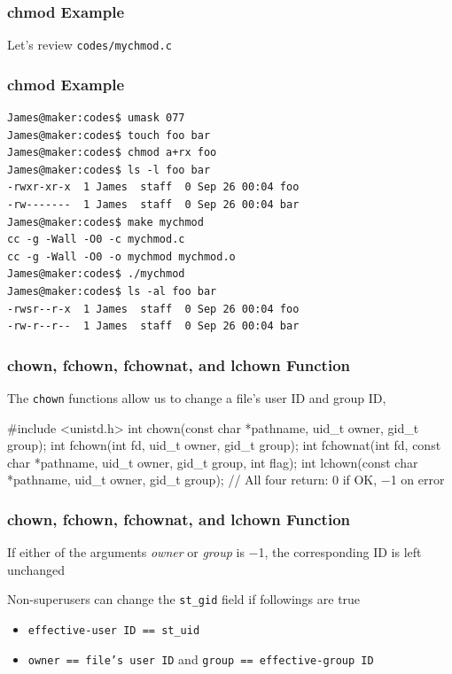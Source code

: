 \documentclass[newPxFont,sthlmFooter,nooffset]{beamer}
\begin{document}
\begin{frame}[containsverbatim,t]
  \frametitle{chmod Example}
Let's review \texttt{codes/mychmod.c}

\end{frame}

\begin{frame}
  \frametitle{chmod Example}
\begin{verbatim}
James@maker:codes$ umask 077
James@maker:codes$ touch foo bar
James@maker:codes$ chmod a+rx foo
James@maker:codes$ ls -l foo bar
-rwxr-xr-x  1 James  staff  0 Sep 26 00:04 foo
-rw-------  1 James  staff  0 Sep 26 00:04 bar
James@maker:codes$ make mychmod
cc -g -Wall -O0 -c mychmod.c
cc -g -Wall -O0 -o mychmod mychmod.o
James@maker:codes$ ./mychmod
James@maker:codes$ ls -al foo bar
-rwsr--r-x  1 James  staff  0 Sep 26 00:04 foo
-rw-r--r--  1 James  staff  0 Sep 26 00:04 bar
\end{verbatim}
\end{frame}


\begin{frame}[containsverbatim,t]
  \frametitle{chown, fchown, fchownat, and lchown Function}
The \texttt{chown} functions allow us to change a file’s user ID and group ID,

\bigskip
\begin{codedef}
#include <unistd.h>
int chown(const char *pathname, uid_t owner, gid_t group);
int fchown(int fd, uid_t owner, gid_t group);
int fchownat(int fd, const char *pathname, uid_t owner, gid_t group, int flag);
int lchown(const char *pathname, uid_t owner, gid_t group);
// All four return: 0 if OK, −1 on error
\end{codedef}
\end{frame}


\begin{frame}[t]
  \frametitle{chown, fchown, fchownat, and lchown Function}
If either of the arguments \textit{owner} or \textit{group} is −1, the corresponding ID is left unchanged

\bigskip
Non-superusers can change the \texttt{st\_gid} field if followings are true
\begin{itemize}
\item \texttt{effective-user ID == st\_uid}
\item \texttt{owner == file's user ID} and \texttt{group == effective-group ID}
\end{itemize}
\end{frame}
\end{document}
